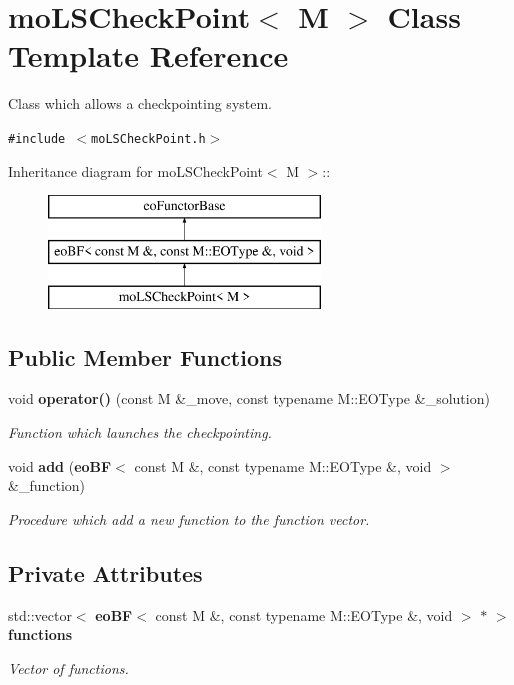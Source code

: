\section{mo\-LSCheck\-Point$<$ M $>$ Class Template Reference}
\label{classmo_l_s_check_point}
Class which allows a checkpointing system.  


{\tt \#include $<$mo\-LSCheck\-Point.h$>$}

Inheritance diagram for mo\-LSCheck\-Point$<$ M $>$::\begin{figure}[H]
\begin{center}
\leavevmode
\includegraphics[height=3cm]{classmo_l_s_check_point}
\end{center}
\end{figure}
\subsection*{Public Member Functions}
\begin{CompactItemize}
\item 
void {\bf operator()} (const M \&\_\-move, const typename M::EOType \&\_\-solution)
\begin{CompactList}\small\item\em Function which launches the checkpointing. \item\end{CompactList}\item 
void {\bf add} ({\bf eo\-BF}$<$ const M \&, const typename M::EOType \&, void $>$ \&\_\-function)
\begin{CompactList}\small\item\em Procedure which add a new function to the function vector. \item\end{CompactList}\end{CompactItemize}
\subsection*{Private Attributes}
\begin{CompactItemize}
\item 
std::vector$<$ {\bf eo\-BF}$<$ const M \&, const typename M::EOType \&, void $>$ $\ast$ $>$ {\bf functions}\label{classmo_l_s_check_point_r0}

\begin{CompactList}\small\item\em Vector of functions. \item\end{CompactList}\end{CompactItemize}


